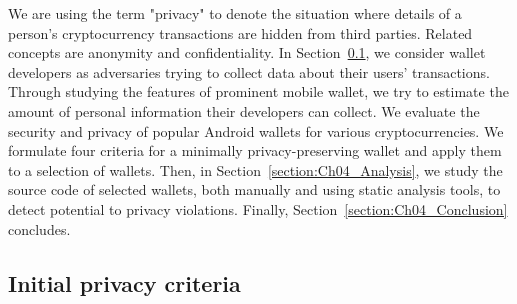 We are using the term "privacy" to denote the situation where details of a person's cryptocurrency transactions are hidden from third parties.
Related concepts are anonymity and confidentiality.
In Section~\ref{section:Ch04_Initial_privacy_criteria}, we consider wallet developers as adversaries trying to collect data about their users' transactions.
Through studying the features of prominent mobile wallet, we try to estimate the amount of personal information their developers can collect.
We evaluate the security and privacy of popular Android wallets for various cryptocurrencies.
We formulate four criteria for a minimally privacy-preserving wallet and apply them to a selection of wallets.
Then, in Section~\ref{section:Ch04_Analysis}, we study the source code of selected wallets, both manually and using static analysis tools, to detect potential to privacy violations.
Finally, Section~\ref{section:Ch04_Conclusion} concludes.

\subsection{Initial privacy criteria} \label{section:Ch04_Initial_privacy_criteria}

